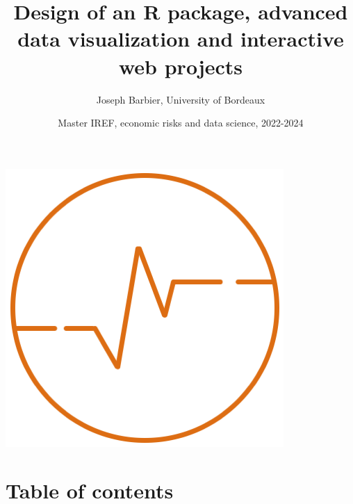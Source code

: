 \documentclass[
]{article}
\title{Design of an R package, advanced data visualization and
interactive web projects}
\author{Joseph Barbier, University of Bordeaux}
\date{Master IREF, economic risks and data science, 2022-2024}
\begin{document}
\maketitle

\hfill\break

\hfill\break

\hfill\break

\begin{center}\includegraphics[width=0.5\linewidth]{logo_top} \end{center}

\newpage

\hypertarget{table-of-contents}{%
\section{\texorpdfstring{Table of contents\\
}{Table of contents }}\label{table-of-contents}}
\end{document}
